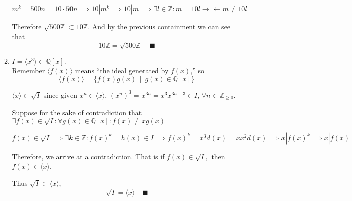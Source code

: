 \documentclass{article}
\newcommand\Z{\mathbb{Z}}
\newcommand\Q{\mathbb{Q}}
\begin{document}
\begin{enumerate}
\begin{enumerate}
  $m^k = 500n = 10\cdot 50n \implies 10|m^k \implies 10| m \implies
  \exists l\in \Z: m = 10l \rightarrow\leftarrow m\neq 10 l$

  Therefore $\sqrt{500\Z}\subset 10\Z$. And by the previous
  containment we can see that \[10\Z = \sqrt{500\Z}\quad \blacksquare\]
	\item $I = \langle x^3\rangle \subset \Q[x]$. \\
	Remember $\langle f(x) \rangle$ means ``the ideal generated by
        $f(x)$,'' so \[\langle f(x) \rangle = \{f(x)g(x)\,\mid\,
          g(x)\in \Q[x]\}\]


        $\langle x \rangle\subset \sqrt{I}$ since given $x^n\in\langle x
        \rangle$, $(x^n)^3 = x^{3n}= x^3x^{3n-3}\in I,\,\forall
        n\in\Z_{\geq 0}$.

        Suppose for the sake of contradiction that
        $\exists f(x) \in \sqrt{I}:\forall
        g(x) \in \Q[x]: f(x) \neq x g(x)$

        $f(x) \in \sqrt{I} \implies \exists k\in \Z: f(x)^k = h(x)\in
        I\implies f(x)^k = x^3 d(x) = x x^2 d(x)\implies x|f(x)^k
        \implies x|f(x)$

        Therefore, we arrive at a contradiction. That is if
        $f(x)\in\sqrt{I},$ then $f(x) \in \langle x \rangle$.

        Thus $\sqrt{I}\subset \langle x \rangle$,\[\sqrt{I} = \langle
          x \rangle\quad \blacksquare\]


\end{enumerate}


\end{enumerate}
\end{document}

